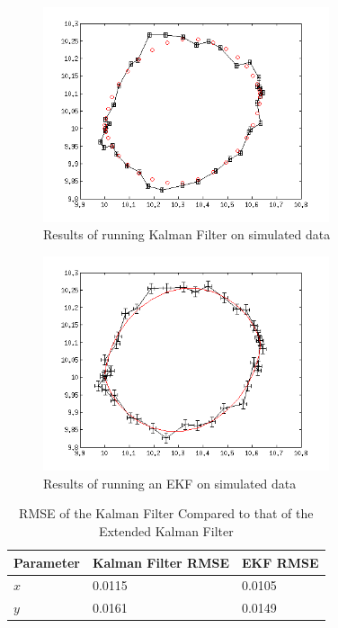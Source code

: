 \documentclass[english]{article}
\begin{document}
\begin{figure}[htp]
\centering
 \includegraphics[width=0.75\textwidth]{images/Kalman.png}
\caption{Results of running Kalman Filter on simulated data}
\label{fig:rkalman}
\end{figure}

\begin{figure}[htp]
\centering
 \includegraphics[width=0.75\textwidth]{images/ExtendedKalman.png}
\caption{Results of running an EKF on simulated data}
\label{fig:rekf}
\end{figure}

\begin{table}[htp]
\begin{center}
\begin{tabular}{|l|l|l|}
\hline
\textbf{Parameter} & \textbf{Kalman Filter RMSE} & \textbf{EKF RMSE} \\
\hline
$x$ & 0.0115 & 0.0105 \\
$y$ & 0.0161 & 0.0149 \\
\hline
\end{tabular}
\end{center}
\caption{RMSE of the Kalman Filter Compared to that of the Extended Kalman Filter}
\label{tbl:rkalman}
\end{table}
\end{document}
